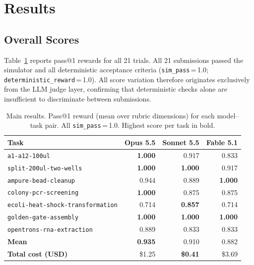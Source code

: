 \documentclass[11pt,a4paper]{article}
\begin{document}
\section{Results}
\label{sec:results}

\subsection{Overall Scores}
\label{sec:overall}

Table~\ref{tab:main} reports pass@1 rewards for all 21 trials.
All 21 submissions passed the simulator and all deterministic acceptance
criteria (\texttt{sim\_pass}\,=\,1.0; \texttt{deterministic\_reward}\,=\,1.0).
All score variation therefore originates exclusively from the LLM judge
layer, confirming that deterministic checks alone are insufficient to
discriminate between submissions.

\begin{table}[H]
\centering
\caption{Main results. Pass@1 reward (mean over rubric dimensions) for each
model--task pair. All \texttt{sim\_pass}\,=\,1.0. Highest score per task
in bold.}
\label{tab:main}
\begin{tabular}{lrrr}
\toprule
\textbf{Task} & \textbf{Opus 5.5} & \textbf{Sonnet 5.5} & \textbf{Fable 5.1} \\
\midrule
\texttt{a1-a12-100ul}                 & \textbf{1.000} & 0.917 & 0.833 \\
\texttt{split-200ul-two-wells}        & \textbf{1.000} & \textbf{1.000} & 0.917 \\
\texttt{ampure-bead-cleanup}          & 0.944 & 0.889 & \textbf{1.000} \\
\texttt{colony-pcr-screening}         & \textbf{1.000} & 0.875 & 0.875 \\
\texttt{ecoli-heat-shock-transformation} & 0.714 & \textbf{0.857} & 0.714 \\
\texttt{golden-gate-assembly}         & \textbf{1.000} & \textbf{1.000} & \textbf{1.000} \\
\texttt{opentrons-rna-extraction}     & 0.889 & 0.833 & 0.833 \\
\midrule
\textbf{Mean}                         & \textbf{0.935} & 0.910 & 0.882 \\
\textbf{Total cost (USD)}             & \$1.25 & \textbf{\$0.41} & \$3.69 \\
\bottomrule
\end{tabular}
\end{table}
\end{document}
